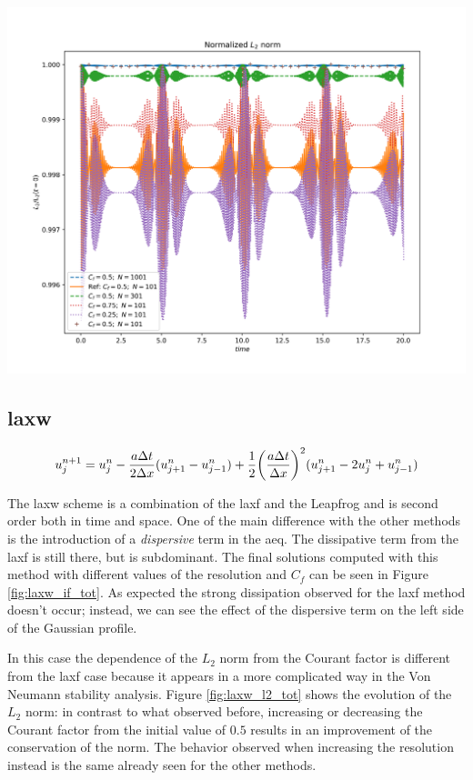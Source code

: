 \documentclass[11pt, a4paper]{article}
\begin{document}
\begin{center}
    \centering
    \includegraphics[width=0.9\linewidth]{images/L2_GAUS_LEAPFROG.png}
    \label{fig:leapfrog_l2_tot}
\end{center}

\subsection{\acrfull{laxw}}

\begin{equation} \label{eq:lax-w}
    u^{n+1}_j = u^n_j - \frac{a \Delta t}{2 \Delta x} (u^n_{j+1} - u^n_{j-1}) + \frac{1}{2}\qty(\frac{a \Delta t}{\Delta x})^2 (u^n_{j+1} - 2u^n_j + u^n_{j-1})
\end{equation}

The \acrshort{laxw} scheme is a combination of the \acrshort{laxf} and the Leapfrog and is second order both in time and space. One of the main difference with the other methods is the introduction of a \textit{dispersive} term in the \acrshort{aeq}. The dissipative term from the \acrshort{laxf} is still there, but is subdominant. The final solutions computed with this method with different values of the resolution and \(C_f\) can be seen in Figure \ref{fig:laxw_if_tot}. As expected the strong dissipation observed for the \acrshort{laxf} method doesn't occur; instead, we can see the effect of the dispersive term on the left side of the Gaussian profile.

In this case the dependence of the \(L_2\) norm from the Courant factor is different from the \acrshort{laxf} case because it appears in a more complicated way in the Von Neumann stability analysis. Figure \ref{fig:laxw_l2_tot} shows the evolution of the \(L_2\) norm: in contrast to what observed before, increasing or decreasing the Courant factor from the initial value of \(0.5\) results in an improvement of the conservation of the norm. The behavior observed when increasing the resolution instead is the same already seen for the other methods.
\end{document}

